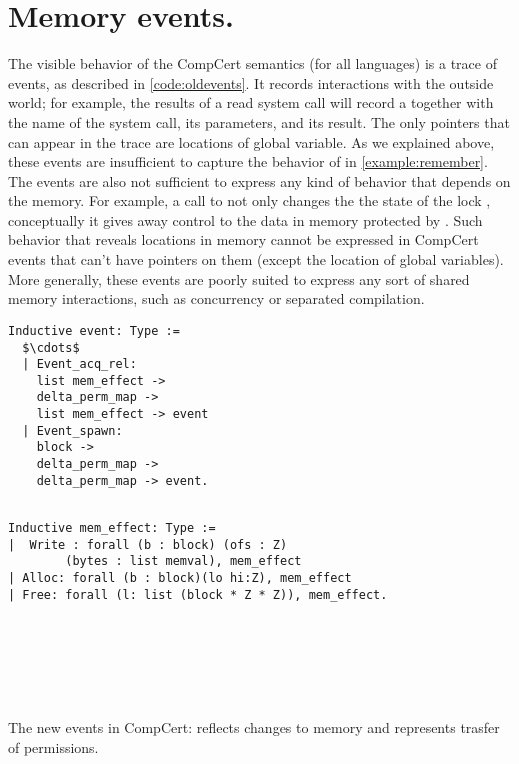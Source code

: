\section{Memory events.}

The visible behavior of the CompCert semantics (for all languages) is a trace of events, as described in \ref{code:oldevents}. It records interactions with the outside world; for example, the results of a read system call will record a  together with the name of the system call, its parameters, and its result. The only pointers that can appear in the trace are locations of global variable. As we explained above, these events are insufficient to capture the behavior of  in \ref{example:remember}. The events are also not sufficient to express any kind of behavior that depends on the memory. For example, a call to  not only changes the the state of the lock , conceptually it gives away control to the data in memory protected by . Such behavior that reveals locations in memory cannot be expressed in CompCert events that can't have pointers on them (except the location of global variables). More generally, these events are poorly suited to express any sort of shared memory interactions, such as concurrency or separated compilation. 
\begin{table}\centering
\begin{multicols}{2}
\begin{lstlisting}
Inductive event: Type :=
  $\cdots$
  | Event_acq_rel: 
  	list mem_effect -> 
	delta_perm_map -> 
	list mem_effect -> event
  | Event_spawn: 
  	block -> 
  	delta_perm_map -> 
  	delta_perm_map -> event.
	
  \end{lstlisting}

	
  \begin{lstlisting}
Inductive mem_effect: Type :=
|  Write : forall (b : block) (ofs : Z)
		(bytes : list memval), mem_effect
| Alloc: forall (b : block)(lo hi:Z), mem_effect
| Free: forall (l: list (block * Z * Z)), mem_effect.
  \end{lstlisting}
  
  \
	
	\
	
	\
	
\end{multicols}
\caption{The new events in CompCert:   reflects changes to memory and  represents trasfer of  permissions.}\label{code:newevents}
\end{table}
